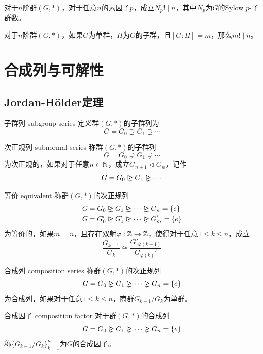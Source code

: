 \begin{corollary}
	对于$n$阶群$(G,*)$，对于任意$n$的素因子$p$，成立$N_p!\mid n$，其中$N_p$为$G$的Sylow $p$-子群数。
\end{corollary}

\begin{corollary}
	对于$n$阶群$(G,*)$，如果$G$为单群，$H$为$G$的子群，且$[G:H]=m$，那么$m!\mid n$。
\end{corollary}

\section{合成列与可解性}

\subsection{Jordan-Hölder定理}

\begin{definition}{子群列 subgroup series}
	定义群$(G,*)$的子群列为
	$$
	G=G_0\supsetneq G_1\supsetneq \cdots
	$$
\end{definition}

\begin{definition}{次正规列 subnormal series}
	称群$(G,*)$的子群列
	$$
	G=G_0\supsetneq G_1\supsetneq \cdots
	$$
	为次正规的，如果对于任意$n\in\mathbb{N}$，成立$G_{n+1}\lhd G_n$，记作
	$$
	G=G_0\rhdneq  G_1\rhdneq \cdots
	$$
\end{definition}

\begin{definition}{等价 equivalent}
	称群$(G,*)$的次正规列
	\begin{align*}
		&G=G_0\rhdneq G_1\rhdneq \cdots\rhdneq G_n=\{e\}\\
		&G=G_0'\rhdneq G_1'\rhdneq \cdots\rhdneq G_m'=\{e\}
	\end{align*}
	为等价的，如果$m=n$，且存在双射$\varphi:\mathbb{Z}\to\mathbb{Z}$，使得对于任意$1\le k\le n$，成立
	$$
	\frac{G_{k-1}}{G_{k}}\cong\frac{G'_{\varphi(k-1)}}{G_{\varphi(k)}'}
	$$
\end{definition}

\begin{definition}{合成列 composition series}
	称群$(G,*)$的次正规列
	$$
	G=G_0\rhdneq G_1\rhdneq \cdots\rhdneq G_n=\{e\}
	$$
	为合成列，如果对于任意$1\le k\le n$，商群$G_{k-1}/G_{k}$为单群。
\end{definition}

\begin{definition}{合成因子 composition factor}
	对于群$(G,*)$的合成列
	$$
	G=G_0\rhdneq G_1\rhdneq \cdots\rhdneq G_n=\{e\}
	$$
	称$\{ G_{k-1}/G_k \}_{k=1}^{n}$为$G$的合成因子。
\end{definition}

